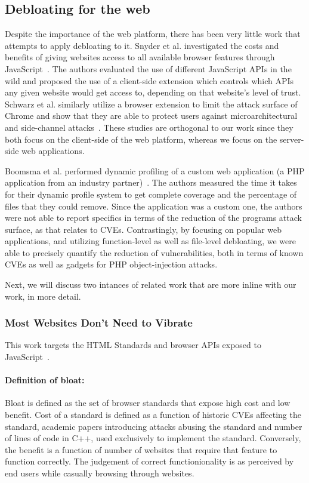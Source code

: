 \subsection{Debloating for the web}
Despite the importance of the web platform, there has been very little work that attempts to apply debloating to it. Snyder et al. investigated the costs and
benefits of giving websites access to all available browser features through
JavaScript~\cite{snyder2017vibrate}. The authors evaluated the use of different
JavaScript APIs in the wild and proposed the use of a client-side extension
which controls which APIs any given website would get access to, depending
on that website's level of trust. Schwarz et al. similarly utilize a browser
extension to limit the attack surface of Chrome and show that they are able
to protect users against microarchitectural and side-channel
attacks~\cite{Schwarz2018}. These studies are orthogonal to our work since
they both focus on the client-side of the web platform, whereas we focus on
the server-side web applications.


Boomsma et al. performed dynamic profiling of a custom web application
(a PHP application from an industry partner)~\cite{boomsma2012Dead}. The
authors measured the time it takes for their dynamic profile system to get
complete coverage and the percentage of files that they could remove. Since the
application was a custom one, the authors were not able to report specifics
in terms of the reduction of the programs attack surface, as that relates
to CVEs. Contrastingly, by focusing on popular web applications, and utilizing function-level as well as file-level debloating, we were
able to precisely quantify the reduction of vulnerabilities, both in terms
of known CVEs as well as gadgets for PHP object-injection attacks.

Next, we will discuss two intances of related work that are more inline with our work, in more detail.

\subsubsection{Most Websites Don't Need to Vibrate}
This work targets the HTML Standards and browser APIs exposed to JavaScript~\cite{snyder2017vibrate}.
\paragraph{Definition of bloat:} Bloat is defined as the set of browser standards that expose high cost and low benefit. Cost of a standard is defined as a function of historic CVEs affecting the standard, academic papers introducing attacks abusing the standard and number of lines of code in C++, used exclusively to implement the standard. Conversely, the benefit is a function of number of websites that require that feature to function correctly. The judgement of correct functionionality is as perceived by end users while casually browsing through websites.
